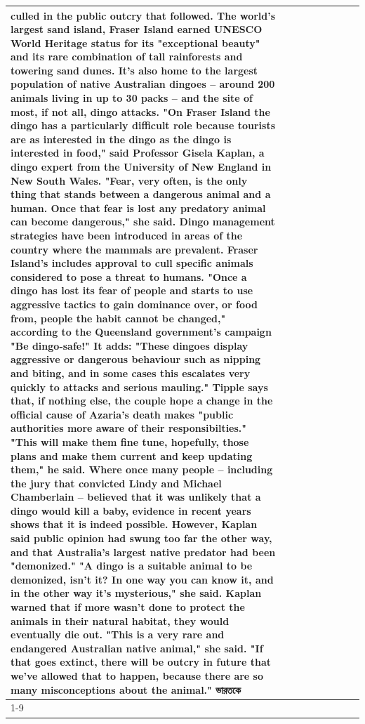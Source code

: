 \begin{table}[H]
\begin{tabular}{lllrlllll}
culled in the public outcry that followed. The world's largest sand island, Fraser Island earned UNESCO World Heritage status for its "exceptional beauty" and its rare combination of tall rainforests and towering sand dunes. It's also home to the largest population of native Australian dingoes -- around 200 animals living in up to 30 packs -- and the site of most, if not all, dingo attacks. "On Fraser Island the dingo has a particularly difficult role because tourists are as interested in the dingo as the dingo is interested in food," said Professor Gisela Kaplan, a dingo expert from the University of New England in New South Wales. "Fear, very often, is the only thing that stands between a dangerous animal and a human. Once that fear is lost any predatory animal can become dangerous," she said. Dingo management strategies have been introduced in areas of the country where the mammals are prevalent. Fraser Island's includes approval to cull specific animals considered to pose a threat to humans. "Once a dingo has lost its fear of people and starts to use aggressive tactics to gain dominance over, or food from, people the habit cannot be changed," according to the Queensland government's campaign "Be dingo-safe!" It adds: "These dingoes display aggressive or dangerous behaviour such as nipping and biting, and in some cases this escalates very quickly to attacks and serious mauling." Tipple says that, if nothing else, the couple hope a change in the official cause of Azaria's death makes "public authorities more aware of their responsibilties." "This will make them fine tune, hopefully, those plans and make them current and keep updating them," he said. Where once many people -- including the jury that convicted Lindy and Michael Chamberlain -- believed that it was unlikely that a dingo would kill a baby, evidence in recent years shows that it is indeed possible. However, Kaplan said public opinion had swung too far the other way, and that Australia's largest native predator had been "demonized." "A dingo is a suitable animal to be demonized, isn't it? In one way you can know it, and in the other way it's mysterious," she said. Kaplan warned that if more wasn't done to protect the animals in their natural habitat, they would eventually die out. "This is a very rare and endangered Australian native animal," she said. "If that goes extinct, there will be outcry in future that we've allowed that to happen, because there are so many misconceptions about the animal." ভারতকে \\
\cline{1-9}

\end{tabular}
\end{table}
